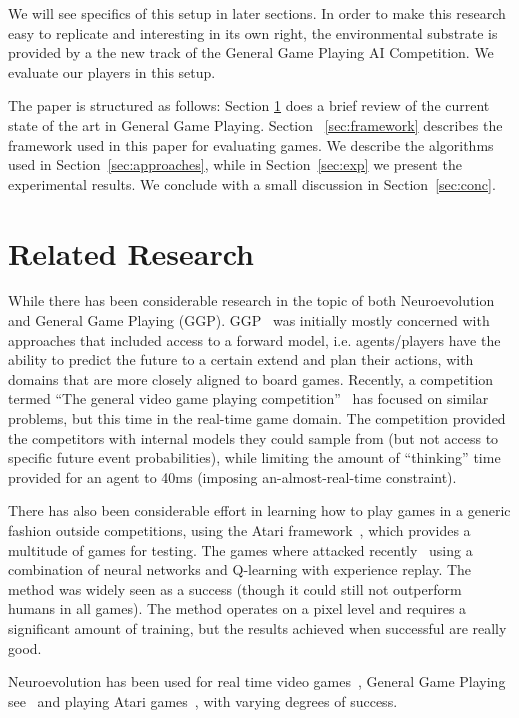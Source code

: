 \documentclass[conference]{IEEEtran}
\begin{document}
We will see specifics of this setup in later sections. In order to make this research easy to replicate and interesting in its own right, the environmental substrate is provided by a the new track of the General Game Playing AI Competition. We evaluate our players in this setup. 

The paper is structured as follows: Section \ref{sec:lit} does a brief review of the current state of the art in General Game Playing. Section ~\ref{sec:framework} describes the framework used in this paper for evaluating games. We describe the algorithms used in Section~\ref{sec:approaches}, while in Section~\ref{sec:exp} we present the experimental results. We conclude with a small discussion in Section~\ref{sec:conc}. 
 
\section{Related Research} \label{sec:lit}
While there has been considerable research in the topic of both Neuroevolution and General Game Playing (GGP). GGP~\cite{genesereth2005general} was initially mostly concerned with approaches that included access to a forward model, i.e. agents/players have the ability to predict the future to a certain extend and plan their actions, with domains that are more closely aligned to board games. Recently, a competition termed ``The general video game playing competition''~\cite{Perez2015} has focused on similar problems, but this time in the real-time game domain. The competition provided the competitors with internal models they could sample from (but not access to specific future event probabilities), while limiting the amount of ``thinking'' time provided for an agent to 40ms (imposing an-almost-real-time constraint). 

There has also been considerable effort in learning how to play games in a generic fashion outside competitions,  using the Atari framework~\cite{13jair}, which provides a multitude of games for testing. The games where attacked recently~\cite{mnih2015human} using a combination of neural networks and Q-learning with experience replay. The method was widely seen as a success (though it could still not outperform humans in all games). The method operates on a pixel level and requires a significant amount of training, but the results achieved when successful are really good. 

Neuroevolution has been used for real time video games~\cite{stanley2005real},  General Game Playing see~\cite{reisinger2007coevolving} and playing Atari games~\cite{hausknecht2012hyperneat}, with varying degrees of success.
\end{document}
